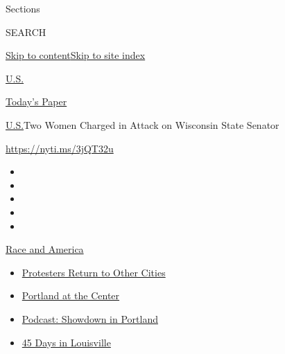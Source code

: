 Sections

SEARCH

\protect\hyperlink{site-content}{Skip to
content}\protect\hyperlink{site-index}{Skip to site index}

\href{https://www.nytimes3xbfgragh.onion/section/us}{U.S.}

\href{https://myaccount.nytimes3xbfgragh.onion/auth/login?response_type=cookie\&client_id=vi}{}

\href{https://www.nytimes3xbfgragh.onion/section/todayspaper}{Today's
Paper}

\href{/section/us}{U.S.}\textbar{}Two Women Charged in Attack on
Wisconsin State Senator

\url{https://nyti.ms/3jQT32u}

\begin{itemize}
\item
\item
\item
\item
\item
\end{itemize}

\href{https://www.nytimes3xbfgragh.onion/news-event/george-floyd-protests-minneapolis-new-york-los-angeles?action=click\&pgtype=Article\&state=default\&region=TOP_BANNER\&context=storylines_menu}{Race
and America}

\begin{itemize}
\tightlist
\item
  \href{https://www.nytimes3xbfgragh.onion/2020/07/26/us/protests-portland-seattle-trump.html?action=click\&pgtype=Article\&state=default\&region=TOP_BANNER\&context=storylines_menu}{Protesters
  Return to Other Cities}
\item
  \href{https://www.nytimes3xbfgragh.onion/2020/07/24/us/portland-oregon-protests-white-race.html?action=click\&pgtype=Article\&state=default\&region=TOP_BANNER\&context=storylines_menu}{Portland
  at the Center}
\item
  \href{https://www.nytimes3xbfgragh.onion/2020/07/23/podcasts/the-daily/portland-protests.html?action=click\&pgtype=Article\&state=default\&region=TOP_BANNER\&context=storylines_menu}{Podcast:
  Showdown in Portland}
\item
  \href{https://www.nytimes3xbfgragh.onion/interactive/2020/07/16/us/black-lives-matter-protests-louisville-breonna-taylor.html?action=click\&pgtype=Article\&state=default\&region=TOP_BANNER\&context=storylines_menu}{45
  Days in Louisville}
\end{itemize}

